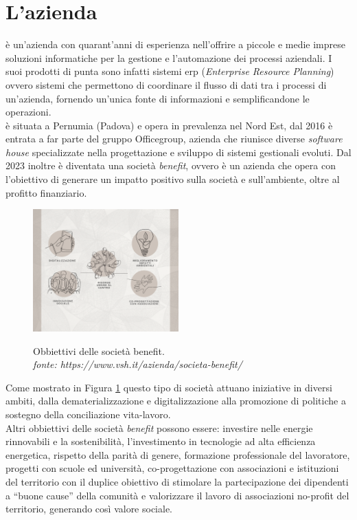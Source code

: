 \section{L'azienda}
{\company} è un'azienda con quarant'anni di esperienza nell'offrire a piccole e medie imprese soluzioni informatiche per la 
gestione e l'automazione dei processi aziendali. I suoi prodotti di punta sono infatti sistemi \gls{erp} (\textit{Enterprise 
Resource Planning}) ovvero sistemi che permettono di coordinare il flusso di dati tra i processi di un'azienda, fornendo un'unica fonte di 
informazioni e semplificandone le operazioni.\\
{\company} è situata a Pernumia (Padova) e opera in prevalenza nel Nord Est, dal 2016 è entrata a far parte del gruppo Officegroup, azienda 
che riunisce diverse \textit{software house} specializzate nella progettazione e sviluppo di sistemi gestionali evoluti. 
Dal 2023 inoltre è diventata una società \textit{benefit}, ovvero è un azienda che opera con l'obiettivo di generare un impatto positivo 
sulla società e sull'ambiente, oltre al profitto finanziario.

\begin{figure}[H]
    \centering
    \includegraphics[alt={Obbiettivi delle società benefit}, width=0.5\textwidth]{img/soc-benefit.png}
    \caption[Obbiettivi delle società benefit.]{Obbiettivi delle società benefit. \\ \textit{fonte: https://www.vsh.it/azienda/societa-benefit/}}
    \label{fig:società benefit}
\end{figure}

Come mostrato in Figura \ref{fig:società benefit} questo tipo di società attuano iniziative in diversi ambiti, dalla dematerializzazione 
e digitalizzazione alla promozione di politiche a sostegno della conciliazione vita-lavoro.\\
Altri obbiettivi delle società \textit{benefit} possono essere: investire nelle energie rinnovabili e la sostenibilità, l'investimento in tecnologie 
ad alta efficienza energetica, rispetto della parità di genere, formazione professionale del lavoratore, progetti con scuole ed 
università, co-progettazione con associazioni e istituzioni del territorio con il duplice obiettivo di stimolare la partecipazione dei dipendenti 
a “buone cause” della comunità e valorizzare il lavoro di associazioni no-profit del territorio, generando così valore sociale.

